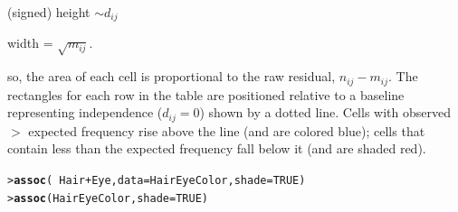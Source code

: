 \documentclass[10pt,krantz2]{krantz}\usepackage[]{graphicx}\usepackage[]{color}
\makeatletter
\newcommand{\hlnum}[1]{\textcolor[rgb]{0.686,0.059,0.569}{#1}}%
\newcommand{\hlopt}[1]{\textcolor[rgb]{0,0,0}{#1}}%
\newcommand{\hlstd}[1]{\textcolor[rgb]{0.345,0.345,0.345}{#1}}%
\newcommand{\hlkwc}[1]{\textcolor[rgb]{0.333,0.667,0.333}{#1}}%
\newcommand{\hlkwd}[1]{\textcolor[rgb]{0.737,0.353,0.396}{\textbf{#1}}}%
\newenvironment{kframe}{%
 \def\at@end@of@kframe{}%
 \ifinner\ifhmode%
  \def\at@end@of@kframe{\end{minipage}}%
  \begin{minipage}{\columnwidth}%
 \fi\fi%
 \def\FrameCommand##1{\hskip\@totalleftmargin \hskip-\fboxsep
 \colorbox{shadecolor}{##1}\hskip-\fboxsep
     \hskip-\linewidth \hskip-\@totalleftmargin \hskip\columnwidth}%
 \MakeFramed {\advance\hsize-\width
   \@totalleftmargin\z@ \linewidth\hsize
   \@setminipage}}%
 {\par\unskip\endMakeFramed%
 \at@end@of@kframe}
\newenvironment{knitrout}{}{} %
\renewenvironment{knitrout}{\small\renewcommand{\baselinestretch}{.85}}{} %
\makeatother
\begin{document}
\begin{itemize*}
\item (signed) height \(\sim d_{ij}\)

\item width = \(\sqrt { m_{ij}}\).
\end{itemize*}
so, the area of each cell is proportional to the raw residual,
\(n_{ij} - m_{ij}\).
The rectangles for each row in the table are positioned relative to a
baseline representing independence (\(d_{ij} = 0\)) shown by a dotted
line.  Cells with observed \(>\) expected frequency rise above the line
(and are colored blue); cells that contain less than the expected
frequency fall below it (and are shaded red).
\begin{knitrout}
\color{fgcolor}\begin{kframe}
\begin{alltt}
\hlstd{> }\hlkwd{assoc}\hlstd{(}\hlopt{~} \hlstd{Hair} \hlopt{+} \hlstd{Eye,} \hlkwc{data} \hlstd{= HairEyeColor,} \hlkwc{shade} \hlstd{=} \hlnum{TRUE}\hlstd{)}
\hlstd{> }\hlkwd{assoc}\hlstd{(HairEyeColor,} \hlkwc{shade} \hlstd{=} \hlnum{TRUE}\hlstd{)}
\end{alltt}
\end{kframe}
\end{knitrout}
\end{document}
